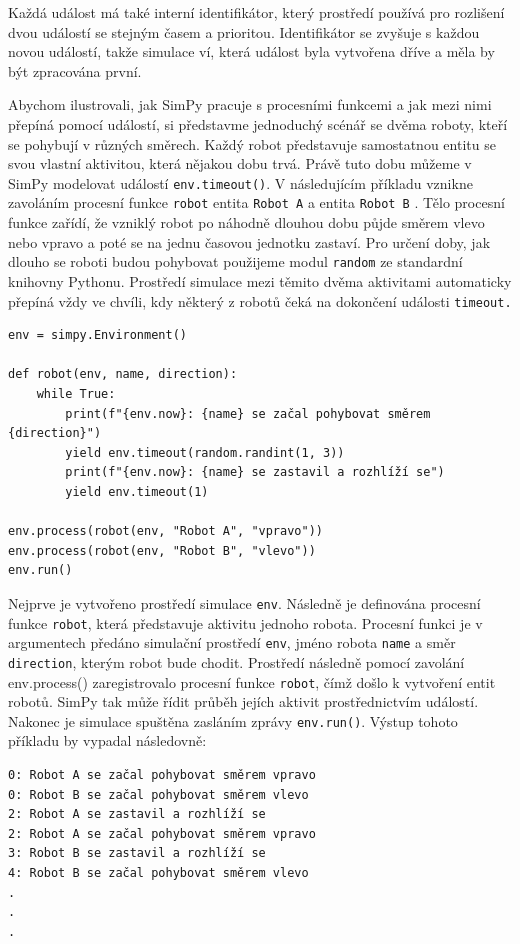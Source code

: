 \documentclass[
  program=itp,
  biblatex,
  figures=false,
  glossaries,
  index
]{kidiplom}
\begin{document}
Každá událost má také interní identifikátor, který prostředí používá pro rozlišení dvou událostí se stejným časem a prioritou.
Identifikátor se zvyšuje s každou novou událostí, takže simulace ví, která událost byla vytvořena dříve a měla by být zpracována první.

\noindent Abychom ilustrovali, jak SimPy pracuje s procesními funkcemi a jak mezi nimi přepíná pomocí událostí, si představme jednoduchý scénář se dvěma roboty, kteří se pohybují v různých směrech. Každý robot představuje samostatnou entitu se svou vlastní aktivitou, která nějakou dobu trvá. Právě tuto dobu můžeme v SimPy modelovat  událostí \texttt{env.timeout()}. V následujícím příkladu vznikne zavoláním procesní funkce \texttt{robot} entita \texttt{Robot A} a entita \texttt{Robot B} .
Tělo procesní funkce zařídí, že vzniklý robot po náhodně dlouhou dobu půjde směrem vlevo nebo vpravo a poté se na jednu časovou jednotku zastaví. Pro určení doby, jak dlouho se roboti budou pohybovat použijeme modul \texttt{random} ze standardní knihovny Pythonu. Prostředí simulace mezi těmito dvěma aktivitami automaticky přepíná vždy ve chvíli, kdy některý z robotů čeká na dokončení události \texttt{timeout.}

 \begin{verbatim} 
env = simpy.Environment()

def robot(env, name, direction):
    while True:
        print(f"{env.now}: {name} se začal pohybovat směrem {direction}")
        yield env.timeout(random.randint(1, 3))
        print(f"{env.now}: {name} se zastavil a rozhlíží se")
        yield env.timeout(1)       

env.process(robot(env, "Robot A", "vpravo"))
env.process(robot(env, "Robot B", "vlevo"))
env.run()
\end{verbatim}

\noindent Nejprve je vytvořeno prostředí simulace \texttt{env}. Následně je definována procesní funkce \texttt{robot}, která představuje aktivitu jednoho robota. Procesní funkci je v argumentech předáno simulační prostředí \texttt{env}, jméno robota \texttt{name} a směr \texttt{direction}, kterým robot bude chodit. Prostředí následně pomocí zavolání env.process() zaregistrovalo procesní funkce \texttt{robot}, čímž došlo k vytvoření entit robotů. SimPy tak může řídit průběh jejích aktivit prostřednictvím událostí. Nakonec je simulace spuštěna zasláním zprávy \texttt{env.run()}. Výstup tohoto příkladu by vypadal následovně:

 \begin{verbatim} 
0: Robot A se začal pohybovat směrem vpravo
0: Robot B se začal pohybovat směrem vlevo
2: Robot A se zastavil a rozhlíží se
2: Robot A se začal pohybovat směrem vpravo
3: Robot B se zastavil a rozhlíží se
4: Robot B se začal pohybovat směrem vlevo
.
.
.
\end{verbatim}
\end{document}
